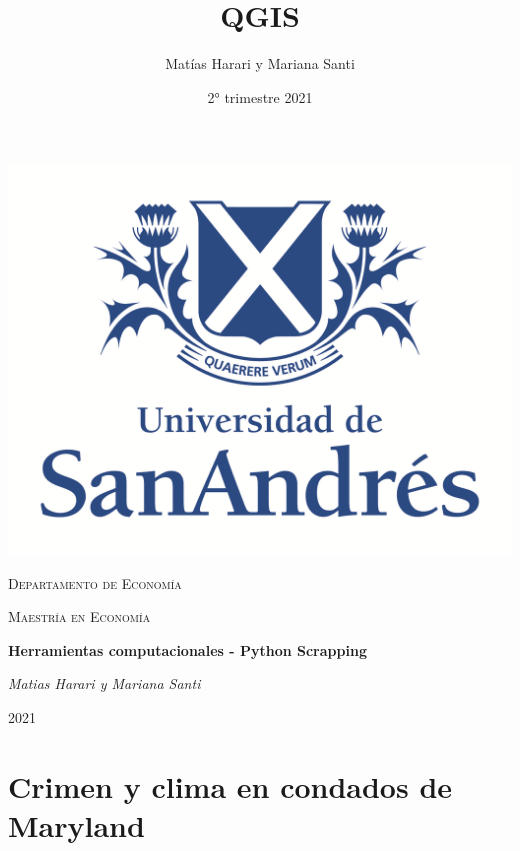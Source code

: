 \documentclass[10.5pt]{article}   %
\title{QGIS}
\author{Matías Harari y Mariana Santi}
\date{2° trimestre 2021}
\begin{document}
\renewcommand{\thesubsection}{\thesection.\alph{subsection}}

\thispagestyle{empty}
\setlength\headheight{0pt} 
\begin{center}

\begin{center}
\includegraphics[width=0.65\linewidth]{imgs/logoudesa.png}            
\end{center}	

        \vspace{0.2cm}
        {\scshape\LARGE Departamento de Economía \par}
        \vspace{0.2cm}
        {\scshape\Large Maestría en Economía\par}
        \vspace{0.4cm}

        {\Large\bfseries Herramientas computacionales - Python Scrapping\par}
        
        \vspace{1cm}
        {\Large\itshape Matias Harari y Mariana Santi \par}


\vspace{1cm} 
\large
{2021}

\end{center}

\clearpage
\justify




\section*{Crimen y clima en condados de Maryland}
\end{document}
